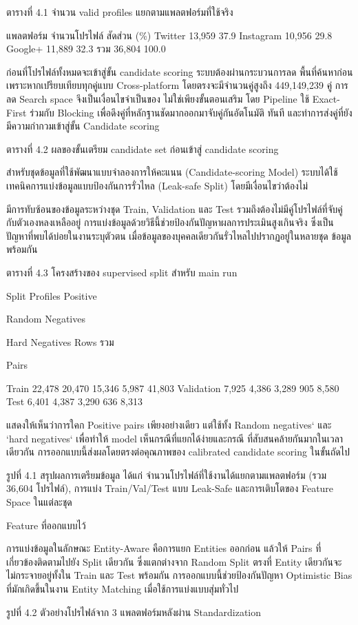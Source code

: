 \documentclass[12pt,a4paper]{report}
\begin{document}
\begin{center}\small ตารางที่ 4.1 จำนวน valid profiles แยกตามแพลตฟอร์มที่ใช้จริง\end{center}
แพลตฟอร์ม จำนวนโปรไฟล์ สัดส่วน (\%) Twitter 13,959 37.9 Instagram 10,956 29.8 Google+ 11,889 32.3 รวม 36,804 100.0\par
ก่อนที่โปรไฟล์ทั้งหมดจะเข้าสู่ขั้น candidate scoring ระบบต้องผ่านกระบวนการลด พื้นที่ค้นหาก่อน เพราะหากเปรียบเทียบทุกคู่แบบ Cross-platform โดยตรงจะมีจำนวนคู่สูงถึง 449,149,239 คู่ การลด Search space จึงเป็นเงื่อนไขจำเป็นของ ไม่ใช่เพียงขั้นตอนเสริม โดย Pipeline ใช้ Exact-First ร่วมกับ Blocking เพื่อดึงคู่ที่หลักฐานชัดมากออกมาจับคู่กันอัตโนมัติ ทันที และทำการส่งคู่ที่ยังมีความกำกวมเข้าสู่ขั้น Candidate scoring\par
\begin{center}\small ตารางที่ 4.2 ผลของขั้นเตรียม candidate set ก่อนเข้าสู่ candidate scoring\end{center}
สำหรับชุดข้อมูลที่ใช้พัฒนาแบบจำลองการให้คะแนน (Candidate-scoring Model) ระบบได้ใช้เทคนิคการแบ่งข้อมูลแบบป้องกันการรั่วไหล (Leak-safe Split) โดยมีเงื่อนไขว่าต้องไม่\par
\clearpage
มีการทับซ้อนของข้อมูลระหว่างชุด Train, Validation และ Test รวมถึงต้องไม่มีคู่โปรไฟล์ที่จับคู่ กับตัวเองหลงเหลืออยู่ การแบ่งข้อมูลด้วยวิธีนี้ช่วยป้องกันปัญหาผลการประเมินสูงเกินจริง ซึ่งเป็น ปัญหาที่พบได้บ่อยในงานระบุตัวตน เมื่อข้อมูลของบุคคลเดียวกันรั่วไหลไปปรากฏอยู่ในหลายชุด ข้อมูลพร้อมกัน\par
\begin{center}\small ตารางที่ 4.3 โครงสร้างของ supervised split สำหรับ main run\end{center}
Split Profiles Positive\par
Random Negatives\par
Hard Negatives Rows รวม\par
Pairs\par
Train 22,478 20,470 15,346 5,987 41,803 Validation 7,925 4,386 3,289 905 8,580 Test 6,401 4,387 3,290 636 8,313\par
แสดงให้เห็นว่าการใคก Positive pairs เพียงอย่างเดียว แต่ใช้ทั้ง Random negatives` และ `hard negatives` เพื่อทำให้ model เห็นกรณีที่แยกได้ง่ายและกรณี ที่สับสนคล้ายกันมากในเวลาเดียวกัน การออกแบบนี้ส่งผลโดยตรงต่อคุณภาพของ calibrated candidate scoring ในขั้นถัดไป\par
\begin{center}\small รูปที่ 4.1 สรุปผลการเตรียมข้อมูล ได้แก่ จำนวนโปรไฟล์ที่ใช้งานได้แยกตามแพลตฟอร์ม (รวม 36,604 โปรไฟล์), การแบ่ง Train/Val/Test แบบ Leak-Safe และการเติบโตของ Feature Space ในแต่ละชุด\end{center}
Feature ที่ออกแบบไว้\par
การแบ่งข้อมูลในลักษณะ Entity-Aware คือการแยก Entities ออกก่อน แล้วให้ Pairs ที่ เกี่ยวข้องติดตามไปยัง Split เดียวกัน ซึ่งแตกต่างจาก Random Split ตรงที่ Entity เดียวกันจะ ไม่กระจายอยู่ทั้งใน Train และ Test พร้อมกัน การออกแบบนี้ช่วยป้องกันปัญหา Optimistic Bias ที่มักเกิดขึ้นในงาน Entity Matching เมื่อใช้การแบ่งแบบสุ่มทั่วไป\par
\clearpage
\begin{center}\small รูปที่ 4.2 ตัวอย่างโปรไฟล์จาก 3 แพลตฟอร์มหลังผ่าน Standardization\end{center}
\end{document}
